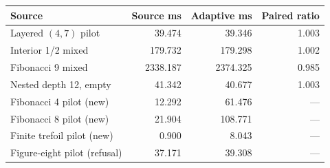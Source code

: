 \begin{center}
\small
\begin{tabular}{lrrr}
\toprule
Source & Source ms & Adaptive ms & Paired ratio\\
\midrule
Layered $(4,7)$ pilot & 39.474 & 39.346 & 1.003\\
Interior 1/2 mixed & 179.732 & 179.298 & 1.002\\
Fibonacci 9 mixed & 2338.187 & 2374.325 & 0.985\\
Nested depth 12, empty & 41.342 & 40.677 & 1.003\\
Fibonacci 4 pilot (new) & 12.292 & 61.476 & ---\\
Fibonacci 8 pilot (new) & 21.904 & 108.771 & ---\\
Finite trefoil pilot (new) & 0.900 & 8.043 & ---\\
Figure-eight pilot (refusal) & 37.171 & 39.308 & ---\\
\bottomrule
\end{tabular}
\end{center}
